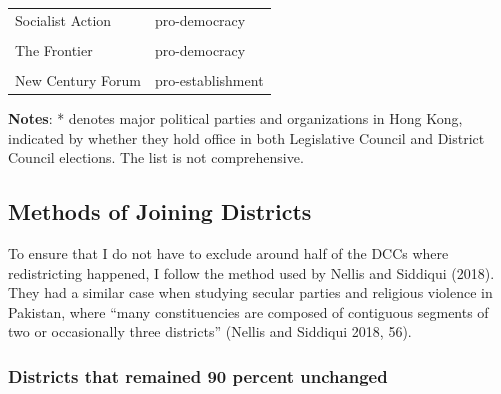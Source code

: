 \documentclass[letterpaper, 12pt]{article}
\begin{document}
\begin{appendices}
\begin{longtable}[c]{ll}
Socialist Action & pro-democracy\\
\cellcolor{gray!6}{IOU} & \cellcolor{gray!6}{neutral/unknown}\\
The Frontier & pro-democracy\\
\cellcolor{gray!6}{Kowloon East Community} & \cellcolor{gray!6}{pro-democracy}\\
New Century Forum & pro-establishment\\
\bottomrule
\end{longtable}
{\raggedright \textbf{Notes}: * denotes major political parties and organizations in Hong Kong, indicated by whether they hold office in both Legislative Council and District Council elections. The list is not comprehensive. \par}
\endgroup{}










\pagebreak
\subsection{Methods of Joining Districts} \label{appendix:joining_methods}
To ensure that I do not have to exclude around half of the DCCs where redistricting happened, I follow the method used by Nellis and Siddiqui (2018). They had a similar case when studying secular parties and religious violence in Pakistan, where ``many constituencies are composed of contiguous segments of two or occasionally three districts'' (Nellis and Siddiqui 2018, 56).

\subsubsection*{Districts that remained 90 percent unchanged}


\end{appendices}
\end{document}
